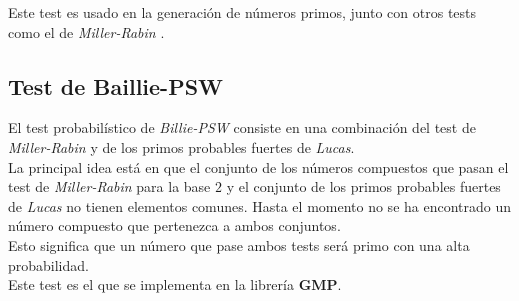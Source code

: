 Este test es usado en la generación de números primos, junto con otros tests como el de \textit{Miller-Rabin} \cite{digital_signature_standard}.

\subsection{Test de Baillie-PSW}

El test probabilístico de \textit{Billie-PSW} consiste en una combinación del test de \textit{Miller-Rabin} y de los primos probables fuertes de \textit{Lucas}.\\

La principal idea está en que el conjunto de los números compuestos que pasan el test de \textit{Miller-Rabin} para la base $2$ y el conjunto de los primos probables fuertes de \textit{Lucas} no tienen elementos comunes. Hasta el momento no se ha encontrado un número compuesto que pertenezca a ambos conjuntos.\\

Esto significa que un número que pase ambos tests será primo con una alta probabilidad.\\

Este test es el que se implementa en la librería \textbf{GMP}.

\endinput
